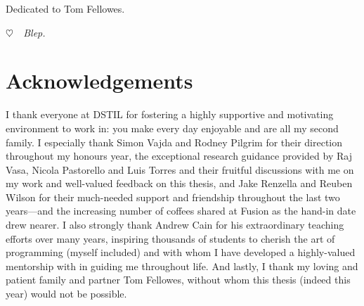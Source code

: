 \cleardoublepage
\pagestyle{empty}
\begin{center}
  \vspace*{0.3\paperheight}
  Dedicated to Tom Fellowes.
  
  {\color{white} \itshape $\heartsuit$~~Blep.}
\end{center}
\pagestyle{fancy}

\chapter*{Acknowledgements}

I thank everyone at DSTIL for fostering a highly supportive and motivating environment to work in: you make every day enjoyable and are all my second family. I especially thank Simon Vajda and Rodney Pilgrim for their direction throughout my honours year, the exceptional research guidance provided by Raj Vasa, Nicola Pastorello and Luis Torres and their fruitful discussions with me on my work and well-valued feedback on this thesis, and Jake Renzella and Reuben Wilson for their much-needed support and friendship throughout the last two years---and the increasing number of coffees shared at Fusion as the hand-in date drew nearer. I also strongly thank Andrew Cain for his extraordinary teaching efforts over many years, inspiring thousands of students to cherish the art of programming (myself included) and with whom I have developed a highly-valued mentorship with in guiding me throughout life. And lastly, I thank my loving and patient family and partner Tom Fellowes, without whom this thesis (indeed this year) would not be possible.